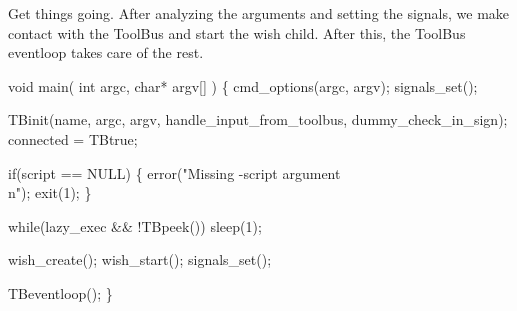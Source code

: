
Get things going. After analyzing the arguments and setting the signals,
we make contact with the ToolBus and start the wish child.
After this, the ToolBus eventloop takes care of the rest.

\nwenddocs{}\endmoddef\let\nwnotused=\nwoutput{}\nwstartdeflinemarkup{}\nwenddeflinemarkup
void main( int argc, char* argv[] )
\{
   cmd_options(argc, argv);
   signals_set();
   
   TBinit(name, argc, argv, handle_input_from_toolbus, dummy_check_in_sign);
   connected = TBtrue;

   if(script == NULL) \{
      error("Missing -script argument\\n");
      exit(1);
   \}

   while(lazy_exec && !TBpeek())
      sleep(1);

   wish_create();
   wish_start();
   signals_set();
   
   TBeventloop();
\}
\nwendcode{}

